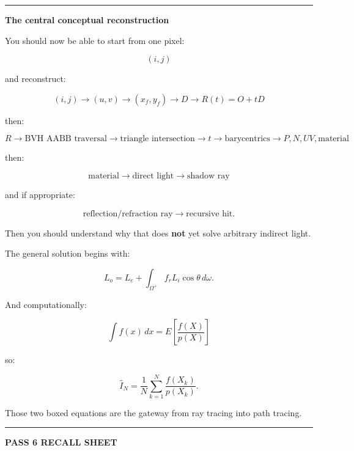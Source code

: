 \begin{center}\rule{0.5\linewidth}{0.5pt}\end{center}

\textbf{The central conceptual reconstruction}

You should now be able to start from one pixel:

\[
(i,j)
\]

and reconstruct:

\[
(i,j)
\rightarrow
(u,v)
\rightarrow
(x_f,y_f)
\rightarrow
D
\rightarrow
R(t)=O+tD
\]

then:

\[
R
\rightarrow
\text{BVH AABB traversal}
\rightarrow
\text{triangle intersection}
\rightarrow
t
\rightarrow
\text{barycentrics}
\rightarrow
P,N,UV,\text{material}
\]

then:

\[
\text{material}
\rightarrow
\text{direct light}
\rightarrow
\text{shadow ray}
\]

and if appropriate:

\[
\text{reflection/refraction ray}
\rightarrow
\text{recursive hit}.
\]

Then you should understand why that does \textbf{not} yet solve arbitrary indirect light.

The general solution begins with:

\[
L_o=
L_e+
\int_{\Omega^+}
f_rL_i\cos\theta\,d\omega.
\]

And computationally:

\[
\boxed{
\int f(x)\,dx
=
E
\left[
\frac{f(X)}{p(X)}
\right]
}
\]

so:

\[
\boxed{
\hat I_N
=
\frac1N
\sum_{k=1}^{N}
\frac{
f(X_k)
}{
p(X_k)
}.
}
\]

Those two boxed equations are the gateway from ray tracing into path tracing.

\begin{center}\rule{0.5\linewidth}{0.5pt}\end{center}

\textbf{PASS 6 RECALL SHEET}

